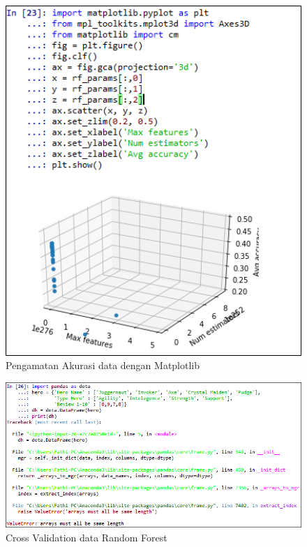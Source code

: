 \begin{figure}
	\centerline{\includegraphics[width=1\textwidth]{figures/fathi/chapter3/hari2/12.png}}
	\caption{Pengamatan Akurasi data dengan Matplotlib}
	\label{p9}
\end{figure}

\begin{figure}
	\centerline{\includegraphics[width=1\textwidth]{figures/fathi/chapter3/hari2/error.png}}
	\caption{Cross Validation data Random Forest}
	\label{error}
\end{figure}

